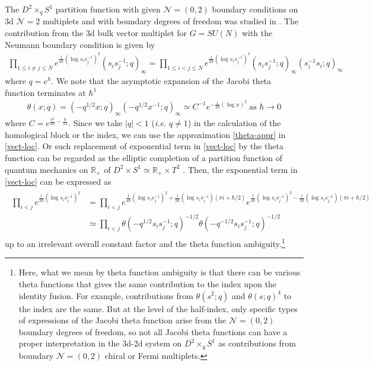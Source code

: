 \documentclass[11pt,hyper,a4paper]{article}
\begin{document}
The $D^2 \times_q S^1$ partition function with given $\mathcal{N}=(0,2)$ boundary conditions on 3d $\mathcal{N}=2$ multiplets and with boundary degrees of freedom was studied in \cite{Gadde-Gukov-Putrov-wall, Gadde-Gukov-Putrov-4manifold,Yoshida-Sugiyama, Dimofte-Gaiotto-Paquette}.
The contribution from the 3d bulk vector multiplet for $G=SU(N)$ with the Neumann boundary condition \cite{Yoshida-Sugiyama} is given by
\begin{align}
\prod_{1 \leq i \neq j \leq N} e^{\frac{1}{4 \hbar} (\log s_i s_j^{-1})^2} (s_i s_j^{-1};q)_\infty
= \prod_{1 \leq i < j \leq N} e^{\frac{1}{2 \hbar} (\log s_i s_j^{-1})^2 } (s_i s_j^{-1};q)_\infty (s_i^{-1} s_i;q)_\infty	\label{vect-loc}
\end{align}
where $q=e^{\hbar}$.
We note that the asymptotic expansion of the Jacobi theta function terminates at $\hbar^1$
\begin{align}
\theta(x;q) = (-q^{1/2} x;q )_\infty (-q^{1/2} x^{-1};q )_\infty \simeq C^{-1} e^{-\frac{1}{2 \hbar} (\log x)^2 }	\	\text{as }	\hbar \rightarrow 0	\label{theta-appr}
\end{align}
where $C = e^{\frac{\pi^2}{6 \hbar} - \frac{\hbar}{24}}$.
Since we take $|q|<1$ (\textit{i.e.} $q \neq 1$) in the calculation of the homological block or the index, we can use the approximation \eqref{theta-appr} in \eqref{vect-loc}.
Or such replacement of exponential term in \eqref{vect-loc} by the theta function can be regarded as the elliptic completion of a partition function of quantum mechanics on $\mathbb{R}_+$ of $D^2 \times S^1 \simeq \mathbb{R}_+ \times T^2$ \cite{Beem-Dimofte-Pasquetti}. 
Then, the exponential term in \eqref{vect-loc} can be expressed as
\begin{eqnarray}
\begin{split}
\prod_{i<j} e^{\frac{1}{2 \hbar} (\log s_i s_j^{-1})^2} 
&= \prod_{i<j} e^{\frac{1}{4 \hbar} (\log s_i s_j^{-1})^2 + \frac{1}{2\hbar} (\log s_i s_j^{-1}) (\pi i + \hbar/2) } e^{\frac{1}{4 \hbar} (\log s_i s_j^{-1})^2 - \frac{1}{2\hbar} (\log s_i s_j^{-1}) (\pi i + \hbar/2) }	\\
&\simeq \prod_{i<j} \theta(-q^{1/2} s_i s_j^{-1};q)^{-1/2} \theta(-q^{-1/2} s_i s_j^{-1};q)^{-1/2}	\,
\end{split}	
\end{eqnarray}
up to an irrelevant overall constant factor and the theta function ambiguity.\footnote{Here, what we mean by theta function ambiguity is that there can be various theta functions that gives the same contribution to the index upon the identity fusion. 
For example, contributions from $\theta(s^2;q)$ and $\theta(s;q)^4$ to the index are the same.
But at the level of the half-index, only specific types of expressions of the Jacobi theta function arise from the $\mathcal{N}=(0,2)$ boundary degrees of freedom, so not all Jacobi theta functions can have a proper interpretation in the 3d-2d system on $D^2 \times_q S^1$ as contributions from boundary $\mathcal{N}=(0,2)$ chiral or Fermi multiplets.
}
\end{document}
